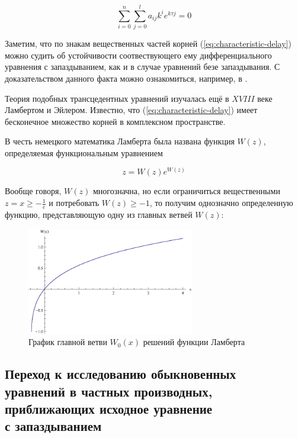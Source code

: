 \begin{equation}\label{eq:characteristic-delay}
\sum\limits_{i=0}^{n} \sum\limits_{j=0}^{l} a_{ij} k^i e^{k \tau j} = 0
\end{equation}

Заметим, что по знакам вещественных частей корней (\ref{eq:characteristic-delay}) можно судить об устойчивости соотвествующего ему дифференциального уравнения с запаздыванием, как и в случае уравнений безе запаздывания. С доказательством данного факта можно ознакомиться, например, в \cite{bib:Elsgoltz-Norkin}.

Теория подобных трансцедентных уравнений изучалась ещё в $XVIII$ веке Ламбертом и Эйлером. Известно, что (\ref{eq:characteristic-delay}) имеет бесконечное множество корней в комплексном пространстве.

В честь немецкого математика Ламберта была названа функция $W(z)$, определяемая функциональным уравнением

\begin{equation}
z = W(z) e^{W(z)}
\end{equation}

Вообще говоря, $W(z)$ многозначна, но если ограничиться вещественными $z = x \geq -\frac{1}{e}$ и потребовать $W(z) \geq -1$, то получим однозначно определенную функцию, представляющую одну из главных ветвей $W(z)$:

\begin{figure}[h]
\begin{center}
\includegraphics[width=0.65\textwidth]{./1_modelling/Lambert.eps}
\end{center}
\caption{График главной ветви $W_0(x)$ решений функции Ламберта}
\end{figure}

\subsection{Переход к исследованию обыкновенных\\уравнений в частных производных,\\приближающих исходное уравнение\\с запаздыванием}\label{sec:transition}


